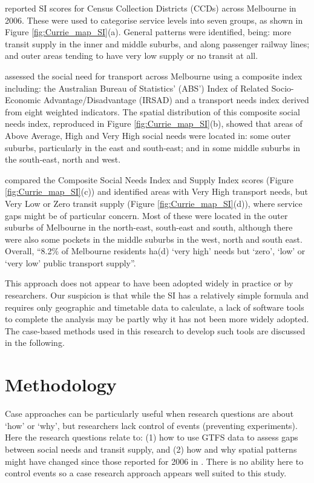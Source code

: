 \documentclass[preprint, 3p,
authoryear]{elsarticle} %
\begin{document}
\citet{currie2010identifying} reported SI scores for Census Collection
Districts (CCDs) across Melbourne in 2006. These were used to categorise
service levels into seven groups, as shown in Figure
\ref{fig:Currie_map_SI}(a). General patterns were identified, being:
more transit supply in the inner and middle suburbs, and along passenger
railway lines; and outer areas tending to have very low supply or no
transit at all.

\citet{currie2010identifying} assessed the social need for transport
across Melbourne using a composite index including: the Australian
Bureau of Statistics' (ABS') Index of Related Socio-Economic
Advantage/Disadvantage (IRSAD) and a transport needs index derived from
eight weighted indicators. The spatial distribution of this composite
social needs index, reproduced in Figure \ref{fig:Currie_map_SI}(b),
showed that areas of Above Average, High and Very High social needs were
located in: some outer suburbs, particularly in the east and south-east;
and in some middle suburbs in the south-east, north and west.

\citet{currie2010identifying} compared the Composite Social Needs Index
and Supply Index scores (Figure \ref{fig:Currie_map_SI}(c)) and
identified areas with Very High transport needs, but Very Low or Zero
transit supply (Figure \ref{fig:Currie_map_SI}(d)), where service gaps
might be of particular concern. Most of these were located in the outer
suburbs of Melbourne in the north-east, south-east and south, although
there were also some pockets in the middle suburbs in the west, north
and south east. Overall, ``8.2\% of Melbourne residents ha(d) `very
high' needs but `zero', `low' or `very low' public transport
supply''\citep{currie2010identifying}.

This approach does not appear to have been adopted widely in practice or
by researchers. Our suspicion is that while the SI has a relatively
simple formula and requires only geographic and timetable data to
calculate, a lack of software tools to complete the analysis may be
partly why it has not been more widely adopted. The case-based methods
used in this research to develop such tools are discussed in the
following.

\section{Methodology}\label{methodology}

Case approaches can be particularly useful when research questions are
about `how' or `why', but researchers lack control of events (preventing
experiments)\citep{Yin2009aa}. Here the research questions relate to:
(1) how to use GTFS data to assess gaps between social needs and transit
supply, and (2) how and why spatial patterns might have changed since
those reported for 2006 in \citet{currie2010identifying}. There is no
ability here to control events so a case research approach appears well
suited to this study.
\end{document}
